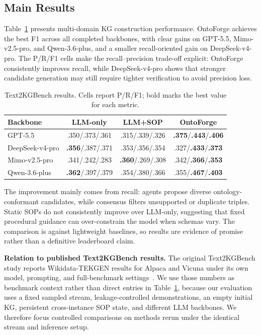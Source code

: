 \documentclass[sigconf]{acmart}
\begin{document}
\subsection{Main Results}

Table~\ref{tab:main_results} presents multi-domain KG construction performance. OntoForge achieves the best F1 across all completed backbones, with clear gains on GPT-5.5, Mimo-v2.5-pro, and Qwen-3.6-plus, and a smaller recall-oriented gain on DeepSeek-v4-pro. The P/R/F1 cells make the recall--precision trade-off explicit: OntoForge consistently improves recall, while DeepSeek-v4-pro shows that stronger candidate generation may still require tighter verification to avoid precision loss.

\begin{table}[!t]
\centering
\small
\setlength{\tabcolsep}{0pt}
\renewcommand{\arraystretch}{1.02}
\caption{Text2KGBench results. Cells report P/R/F1; bold marks the best value for each metric.}
\label{tab:main_results}
\begin{tabular*}{0.98\columnwidth}{@{\extracolsep{\fill}}lccc@{}}
\toprule
Backbone & LLM-only & LLM+SOP & OntoForge \\
\midrule
GPT-5.5 & .350/.373/.361 & .315/.339/.326 & \textbf{.375}/\textbf{.443}/\textbf{.406} \\
DeepSeek-v4-pro & \textbf{.356}/.387/.371 & .353/.356/.354 & .327/\textbf{.433}/\textbf{.373} \\
Mimo-v2.5-pro & .341/.242/.283 & \textbf{.360}/.269/.308 & .342/\textbf{.366}/\textbf{.353} \\
Qwen-3.6-plus & \textbf{.362}/.397/.379 & .354/.380/.366 & .355/\textbf{.467}/\textbf{.403} \\
\bottomrule
\end{tabular*}
\renewcommand{\arraystretch}{1.0}
\end{table}

The improvement mainly comes from recall: agents propose diverse ontology-conformant candidates, while consensus filters unsupported or duplicate triples. Static SOPs do not consistently improve over LLM-only, suggesting that fixed procedural guidance can over-constrain the model when schemas vary. The comparison is against lightweight baselines, so results are evidence of promise rather than a definitive leaderboard claim.

\textbf{Relation to published Text2KGBench results.}
The original Text2KGBench study reports Wikidata-TEKGEN results for Alpaca and Vicuna under its own model, prompting, and full-benchmark settings~\cite{text2kgbench2023}. We use those numbers as benchmark context rather than direct entries in Table~\ref{tab:main_results}, because our evaluation uses a fixed sampled stream, leakage-controlled demonstrations, an empty initial KG, persistent cross-instance SOP state, and different LLM backbones. We therefore focus controlled comparisons on methods rerun under the identical stream and inference setup.
\end{document}
